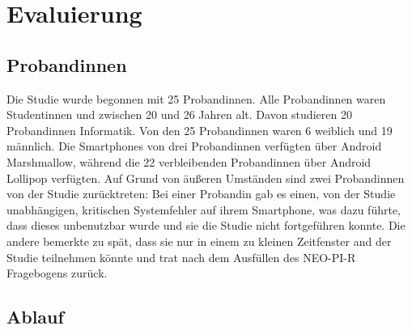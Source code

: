 
\chapter{Evaluierung}
\label{ch:Evaluierung}


\section{Probandinnen}
\label{ch:Evaluierung:sec:Abschnitt1}

Die Studie wurde begonnen mit 25 Probandinnen.
Alle Probandinnen waren Studentinnen und zwischen 20 und 26 Jahren alt.
Davon studieren 20 Probandinnen Informatik. 
Von den 25 Probandinnen waren 6 weiblich und 19 männlich.
Die Smartphones von drei Probandinnen verfügten über Android Marshmallow, während die 22 verbleibenden Probandinnen über Android Lollipop verfügten.  
Auf Grund von äußeren Umständen sind zwei Probandinnen von der Studie zurücktreten:
Bei einer Probandin gab es einen, von der Studie unabhängigen, kritischen Systemfehler auf ihrem Smartphone, was dazu führte, dass dieses unbenutzbar wurde und sie die Studie nicht fortgeführen konnte.
Die andere bemerkte zu spät, dass sie nur in einem zu kleinen Zeitfenster and der Studie teilnehmen könnte und trat nach dem Ausfüllen des NEO-PI-R Fragebogens zurück.


\section{Ablauf}
\label{ch:Entwurf:sec:Abschnitt2}

